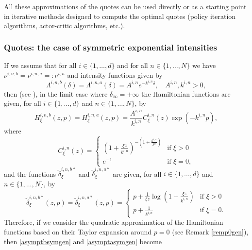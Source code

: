 \documentclass[preprint, 3p]{elsarticle}
\newcommand{\1}{{\chi}}
\begin{document}
All these approximations of the quotes can be used directly or as a starting point in iterative methods designed to compute the optimal quotes (policy iteration algorithms, actor-critic algorithms, etc.).\\

\subsubsection{Quotes: the case of symmetric exponential intensities}
\vspace{3mm}
If we assume that for all $i \in \{1, \ldots, d\}$ and for all $n \in \{1,\ldots,N\}$ we have $\nu^{i,n,b} = \nu^{i,n,a} =: \nu^{i,n}$ and intensity functions given by
\[    \Lambda^{i,n,b} (\delta) = \Lambda^{i,n,a} (\delta) = A^{i,n} e^{-k^{i,n} \delta}, \quad A^{i,n}, k^{i,n} > 0,\]
then (see \cite{gueant2017optimal}), in the limit case where $\delta_\infty = +\infty$ the Hamiltonian functions are given, for all $i \in \{1, \ldots, d\}$ and $n\in \{1,\ldots,N\}$, by
\[H^{i,n,b}_\xi (z,p)
   =  H^{i,n,a}_\xi (z,p) = \frac{A^{i,n}}{k^{i,n}} C^{i,n}_\xi(z) \exp(-k^{i,n} p), \]
 where
 \[ C_\xi^{i,n}(z) =
 \begin{cases}
 \left(1+\frac{\xi z}{k^{i,n}}\right)^{-\left(1+\frac{k^{i,n}}{\xi z}\right)}&\mbox{if }\xi>0\\
 e^{-1}&\mbox{if }\xi=0,
 \end{cases} \]
 and the functions $\tilde{\delta}^{i,n,b*}_\xi$ and $\tilde{\delta}^{i,n,a*}_\xi$ are given, for all $i \in \{1, \ldots, d\}$ and $n\in \{1,\ldots,N\}$, by
\[\tilde\delta^{i,n,b*}_\xi (z,p)
   =  \tilde\delta^{i,n,a*}_\xi (z,p) = \begin{cases}
 p + \frac{1}{\xi z}\log\left(1+\frac{\xi z}{k^{i,n}}\right)&\mbox{if }\xi>0\\
 p + \frac{1}{k^{i,n}}&\mbox{if }\xi=0.
 \end{cases} \]
Therefore, if we consider the quadratic approximation of the Hamiltonian functions based on their Taylor expansion around $p=0$ (see Remark \ref{remp0gen}), then \eqref{asymptbsymgen} and \eqref{asymptasymgen} become
\end{document}
